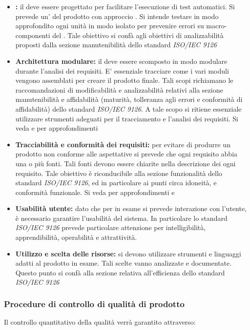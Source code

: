 \documentclass[12pt,a4paper]{article}
\begin{document}
	\begin{itemize}
		\item \textbf{:} il  deve essere progettato per facilitare l'esecuzione di test automatici. Si prevede un'  del prodotto con approccio . Si intende testare in modo approfondito ogni unità  in modo isolato per prevenire errori su macro-componenti del . Tale obiettivo si confà agli obiettivi di analizzabilità proposti dalla sezione manutenibilità dello standard \textit{ISO/IEC 9126}
		\item \textbf{Architettura modulare:} il  deve essere scomposto in modo modulare durante l'analisi dei requisiti. E' essenziale tracciare come i vari moduli vengono assemblati per creare il prodotto finale. Tali scopi richiamano le raccomandazioni di modificabilità e analizzabilità relativi alla sezione manutenibilità e affidabilità (maturità, tolleranza agli errori e conformità di affidabilità) dello standard \textit{ISO/IEC 9126}. A tale scopo si ritiene essenziale utilizzare strumenti adeguati per il tracciamento e l'analisi dei requisiti. Si veda \NdP{} e \AdR{} per approfondimenti
		\item \textbf{Tracciabilità e conformità dei requisiti:} per evitare di produrre un prodotto non conforme alle aspettative si prevede che ogni requisito  abbia una o più fonti. Tali fonti devono essere chiarite nella descrizione dei ogni requisito. Tale obiettivo è riconducibile alla sezione funzionalità dello standard \textit{ISO/IEC 9126}, ed in particolare ai punti circa idoneità, e conformità funzionale. Si veda per approfondimenti \NdP{} e \AdR{}
		\item \textbf{Usabilità utente:} dato che per  in esame si prevede interazione con l'utente, è necessario garantire l'usabilità del sistema. In particolare lo standard \textit{ISO/IEC 9126} prevede particolare attenzione per intelligibilità, apprendibilità, operabilità e attrattività.
		\item \textbf{Utilizzo e scelta delle risorse:} si devono utilizzare strumenti e linguaggi adatti al prodotto in esame. Tali scelte vanno analizzate e documentate. Questo punto si confà alla sezione relativa all'efficienza dello standard \textit{ISO/IEC 9126}
	\end{itemize}
	
	\subsubsection{Procedure di controllo di qualità di prodotto}
	\label{sec:procedure-di-controllo-di-qualità-di-prodotto}
	Il controllo quantitativo della qualità verrà garantito attraverso:
	
\end{document}
